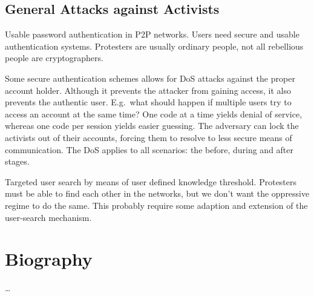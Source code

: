 \documentclass[a4paper]{llncs}
\begin{document}
\subsection{General Attacks against Activists}

Usable password authentication in \ac{P2P} networks.
Users need secure and usable authentication systems.
Protesters are usually ordinary people, not all rebellious people are 
cryptographers.

Some secure authentication schemes allows for \ac{DoS} attacks against the 
proper account holder.
Although it prevents the attacker from gaining access, it also prevents the 
authentic user.
E.g.\ what should happen if multiple users try to access an account at the same 
time?
One code at a time yields denial of service, whereas one code per session 
yields easier guessing.
The adversary can lock the activists out of their accounts, forcing them to 
resolve to less secure means of communication.
The \ac{DoS} applies to all scenarios: the before, during and after stages.

Targeted user search by means of user defined knowledge threshold.
Protesters must be able to find each other in the networks, but we don't want 
the oppressive regime to do the same.
This probably require some adaption and extension of the user-search mechanism.


\printbibliography{}


\appendix
\section{Biography}

\dots
\end{document}
